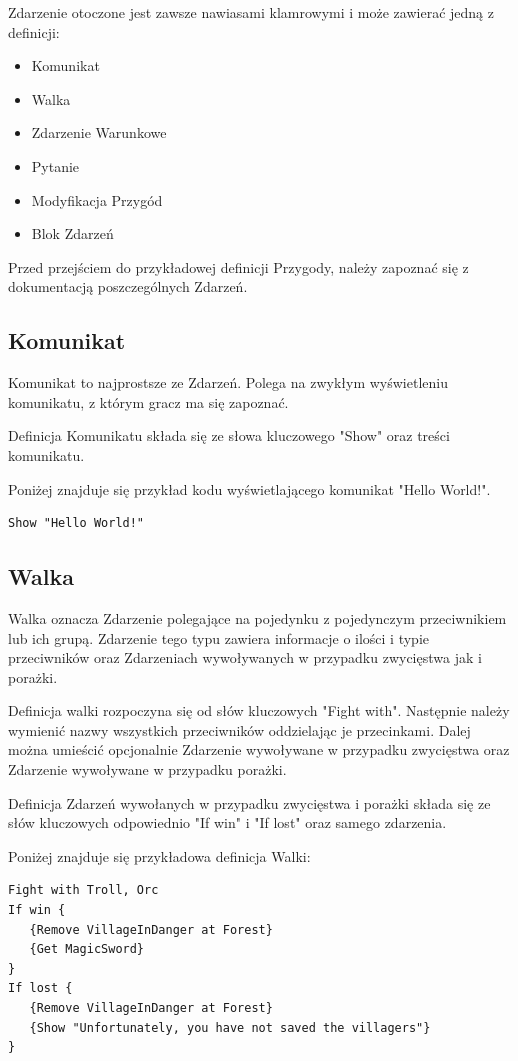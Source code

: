 \documentclass{xmgr}
\begin{document}
Zdarzenie otoczone jest zawsze nawiasami klamrowymi i może zawierać jedną z definicji:
\begin{itemize}
	\item Komunikat
	\item Walka
	\item Zdarzenie Warunkowe
	\item Pytanie
	\item Modyfikacja Przygód
	\item Blok Zdarzeń
\end{itemize}

Przed przejściem do przykładowej definicji Przygody, należy zapoznać się z dokumentacją poszczególnych Zdarzeń.
\subsection{Komunikat}
Komunikat to najprostsze ze Zdarzeń. Polega na zwykłym wyświetleniu komunikatu, z którym gracz ma się zapoznać.

Definicja Komunikatu składa się ze słowa kluczowego "Show" oraz treści komunikatu.

Poniżej znajduje się przykład kodu wyświetlającego komunikat "Hello World!".
\begin{lstlisting}
Show "Hello World!"
\end{lstlisting}

\subsection{Walka}
Walka oznacza Zdarzenie polegające na pojedynku z pojedynczym przeciwnikiem lub ich grupą. Zdarzenie tego typu zawiera informacje o ilości i typie przeciwników oraz Zdarzeniach wywoływanych w przypadku zwycięstwa jak i porażki.

Definicja walki rozpoczyna się od słów kluczowych "Fight with". Następnie należy wymienić nazwy wszystkich przeciwników oddzielając je przecinkami. Dalej można umieścić opcjonalnie Zdarzenie wywoływane w przypadku zwycięstwa oraz Zdarzenie wywoływane w przypadku porażki.

Definicja Zdarzeń wywołanych w przypadku zwycięstwa i porażki składa się ze słów kluczowych odpowiednio "If win" i "If lost" oraz samego zdarzenia.

Poniżej znajduje się przykładowa definicja Walki:
\begin{lstlisting}
Fight with Troll, Orc
If win {
   {Remove VillageInDanger at Forest}
   {Get MagicSword}
}
If lost {
   {Remove VillageInDanger at Forest}
   {Show "Unfortunately, you have not saved the villagers"}
}
\end{lstlisting}
\end{document}
